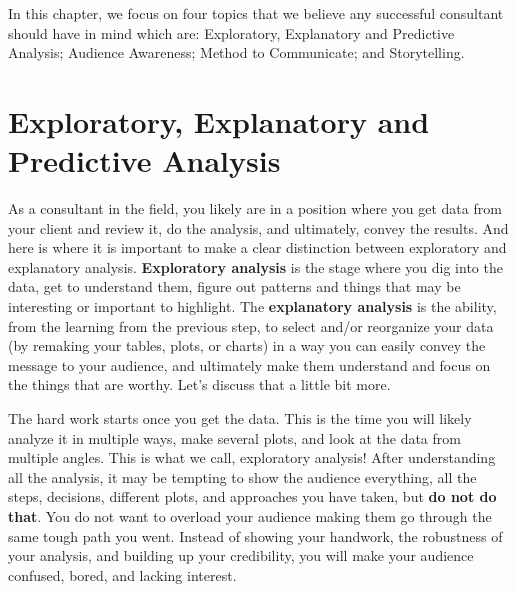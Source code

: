\documentclass[
]{krantz}
\begin{document}
In this chapter, we focus on four topics that we believe any successful consultant should have in mind which are: Exploratory, Explanatory and Predictive Analysis; Audience Awareness; Method to Communicate; and Storytelling.

\hypertarget{exploratory-explanatory-and-predictive-analysis}{%
\section{Exploratory, Explanatory and Predictive Analysis}\label{exploratory-explanatory-and-predictive-analysis}}

As a consultant in the field, you likely are in a position where you get data from your client and review it, do the analysis, and ultimately, convey the results. And here is where it is important to make a clear distinction between exploratory and explanatory analysis. \textbf{Exploratory analysis} is the stage where you dig into the data, get to understand them, figure out patterns and things that may be interesting or important to highlight. The \textbf{explanatory analysis} is the ability, from the learning from the previous step, to select and/or reorganize your data (by remaking your tables, plots, or charts) in a way you can easily convey the message to your audience, and ultimately make them understand and focus on the things that are worthy. Let's discuss that a little bit more.

The hard work starts once you get the data. This is the time you will likely analyze it in multiple ways, make several plots, and look at the data from multiple angles. This is what we call, exploratory analysis! After understanding all the analysis, it may be tempting to show the audience everything, all the steps, decisions, different plots, and approaches you have taken, but \textbf{do not do that}. You do not want to overload your audience making them go through the same tough path you went. Instead of showing your handwork, the robustness of your analysis, and building up your credibility, you will make your audience confused, bored, and lacking interest.
\end{document}
